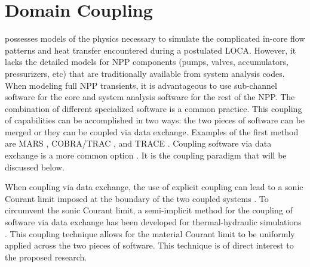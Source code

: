 \section{Domain Coupling}
\label{sect:code_coupling}

\cobra{} possesses models of the physics necessary to simulate the complicated in-core flow patterns and heat transfer encountered during a postulated LOCA.
However, it lacks the detailed models for NPP components (pumps, valves, accumulators, pressurizers, etc) that are traditionally available from system analysis codes.
When modeling full NPP transients, it is advantageous to use sub-channel software for the core and system analysis software for the rest of the NPP.
The combination of different specialized software is a common practice.
This coupling of capabilities can be accomplished in two ways: the two pieces of software can be merged or they can be coupled via data exchange.
Examples of the first method are MARS \cite{Jeong2008}, COBRA/TRAC \cite{Thurgood1983c}, and TRACE \cite{TRACE}.
Coupling software via data exchange is a more common option \cite{Makihara2003, Aumiller2002, Aumiller2001, Avramova2006, Weaver2002, Rodriguez2002}.
It is the coupling paradigm that will be discussed below.

When coupling via data exchange, the use of explicit coupling can lead to a sonic Courant limit imposed at the boundary of the two coupled systems \cite{Ragusa2009, Aumiller2001}.
To circumvent the sonic Courant limit, a semi-implicit method for the coupling of software via data exchange has been developed for thermal-hydraulic simulations \cite{Weaver2002, Aumiller2002}.
This coupling technique allows for the material Courant limit to be uniformly applied across the two pieces of software.
This technique is of direct interest to the proposed research.

